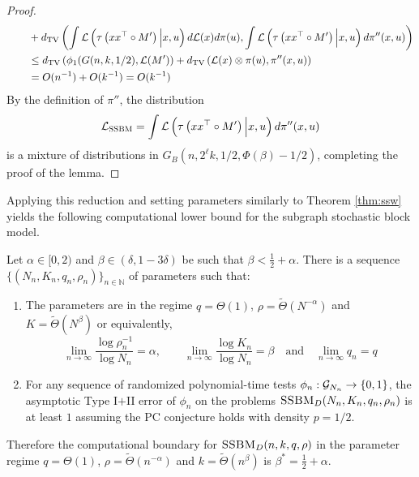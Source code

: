 \begin{proof}
\begin{align*}
&\quad \quad   + d_{\text{TV}}\left( \int \mathcal{L}\left( \tau\left(xx^\top \circ M'\right) \Big| x, u \right) d\mathcal{L}(x) d\pi(u), \int \mathcal{L}\left( \tau\left(xx^\top \circ M'\right) \Big| x, u \right) d\pi''(x, u) \right) \\
&\quad \quad \le d_{\text{TV}}\left( \phi_1(G(n, k, 1/2) , \mathcal{L}(M') \right) + d_{\text{TV}}\left( \mathcal{L}(x) \otimes \pi(u), \pi''(x, u) \right) \\
&\quad \quad = O(n^{-1}) + O(k^{-1}) = O(k^{-1})
\end{align*}
By the definition of $\pi''$, the distribution
$$\mathcal{L}_{\textsc{SSBM}} = \int \mathcal{L}\left( \tau\left(xx^\top \circ M'\right) \Big| x, u \right) d\pi''(x, u)$$
is a mixture of distributions in $G_B\left(n, 2^\ell k, 1/2, \Phi(\beta) - 1/2 \right)$, completing the proof of the lemma.
\end{proof}

Applying this reduction and setting parameters similarly to Theorem \ref{thm:ssw} yields the following computational lower bound for the subgraph stochastic block model.

\begin{theorem} \label{thm:SSBMguar}
Let $\alpha \in [0, 2)$ and $\beta \in (\delta, 1 - 3\delta)$ be such that $\beta < \frac{1}{2} + \alpha$. There is a sequence $\{ (N_n, K_n, q_n, \rho_n) \}_{n \in \mathbb{N}}$ of parameters such that:
\begin{enumerate}
\item The parameters are in the regime $q = \Theta(1)$, $\rho = \tilde{\Theta}(N^{-\alpha})$ and $K = \tilde{\Theta}(N^\beta)$ or equivalently,
$$\lim_{n \to \infty} \frac{\log \rho_n^{-1}}{\log N_n} = \alpha, \quad \quad \lim_{n \to \infty} \frac{\log K_n}{\log N_n} = \beta \quad \text{and} \quad \lim_{n \to \infty} q_n = q$$
\item For any sequence of randomized polynomial-time tests $\phi_n : \mathcal{G}_{N_n} \to \{0, 1\}$, the asymptotic Type I$+$II error of $\phi_n$ on the problems $\textsc{SSBM}_D(N_n, K_n, q_n, \rho_n)$ is at least $1$ assuming the PC conjecture holds with density $p = 1/2$.
\end{enumerate}
Therefore the computational boundary for $\textsc{SSBM}_D(n, k, q, \rho)$ in the parameter regime $q = \Theta(1)$, $\rho = \tilde{\Theta}(n^{-\alpha})$ and $k = \tilde{\Theta}(n^\beta)$ is $\beta^* = \frac{1}{2} + \alpha$.
\end{theorem}

